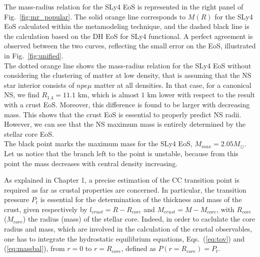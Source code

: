 The mass-radius relation for the SLy4 EoS is represented in the right panel of
Fig.~\ref{fig:mr_popular}. The solid orange line corresponds to $M(R)$ for the 
SLy4 EoS calculated within the metamodeling technique, and the dashed 
black line is the calculation based on the DH EoS for SLy4 functional. A perfect
agreement is observed between the two curves, reflecting the small error on the
EoS, illustrated in Fig.~\ref{fig:unified}. \\
The dotted orange line shows the mass-radius relation for the SLy4 EoS without
considering the clustering of matter at low density, that is assuming that the
NS star interior consists of $npe\mu$ matter at all densities. In that case,
for a canonical NS, we find $R_{1.4} = 11.1$ km, which is almost $1$ km lower 
with respect to the result with a crust EoS. Moreover, this difference is found 
to be larger with decreasing mass. This shows that the crust EoS is essential 
to properly predict NS radii. However, we can see that the NS maximum mass is 
entirely determined by the stellar core EoS.\\
The black point marks the maximum mass for the SLy4 EoS, $M_{max} = 2.05M_\odot$. 
Let us notice that the branch left to the point is unstable, 
because from this point the mass decreases with central density increasing.

As explained in Chapter 1, a precise estimation of the CC transition point is
required as far as crustal properties are concerned. In particular, the
transition pressure $P_t$ is essential for the determination of the thickness 
and mass of the crust, given respectively by $l_{crust}=R-R_{core}$ and
$M_{crust}=M-M_{core}$, with $R_{core}$ ($M_{core}$) the radius
(mass) of the stellar core. Indeed, in order to caclulate the core radius and
mass, which are involved in the calculation of the crustal observables, one has 
to integrate the hydrostatic equilibrium equations, Eqs.~(\ref{eq:tov}) and 
(\ref{eq:massbal}), from $r=0$ to $r=R_{core}$, defined as $P(r=R_{core})=P_t$.

